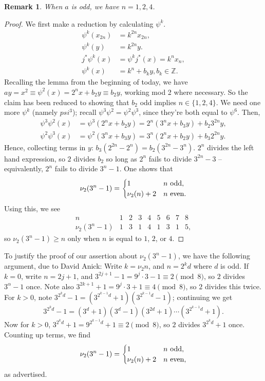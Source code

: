 \documentclass{article}
\newcommand{\Z}{\mathbb{Z}}
\newtheorem{rem}[thm]{Remark}
\begin{document}
\begin{rem}
When $a$ is odd, we have $n = 1, 2, 4$.
\end{rem}
\begin{proof}
We first make a reduction by calculating $\psi^k$.
\begin{align*}
\psi^k(x_{2n}) & = k^{2n} x_{2n}, \\
\psi^k(y) & = k^{2n} y. \\
j^* \psi^k(x) & = \psi^k j^*(x) = k^n x_n, \\
\psi^k(x) & = k^n + b_k y, b_k \in \Z.
\end{align*}
Recalling the lemma from the beginning of today, we have $ay = x^2 \equiv \psi^2(x) = 2^n x + b_2 y \equiv b_2 y$, working mod 2 where necessary.  So the claim has been reduced to showing that $b_2$ odd implies $n \in \{1, 2, 4\}$.  We need one more $\psi^k$ (namely $psi^3$); recall $\psi^3 \psi^2 = \psi^2 \psi^3$, since they're both equal to $\psi^6$.  Then,
\begin{align*}
\psi^3 \psi^2(x) & = \psi^3(2^n x + b_2 y) = 2^n(3^n x + b_3 y) + b_2 3^{2n} y, \\
\psi^2 \psi^3(x) & = \psi^2(3^n x + b_3 y) = 3^n(2^n x + b_2 y) + b_3 2^{2n} y.
\end{align*}
Hence, collecting terms in $y$: $b_3(2^{2n} - 2^n) = b_2(3^{2n} - 3^n)$.  $2^n$ divides the left hand expression, so $2$ divides $b_2$ so long as $2^n$ fails to divide $3^{2n} - 3$ -- equivalently, $2^n$ fails to divide $3^n - 1$.  One shows that
\[
\nu_2(3^n-1) = \begin{cases} 1 & \hbox{$n$ odd}, \\ \nu_2(n) + 2 & \hbox{$n$ even}.\end{cases}
\]
Using this, we see
\[
\begin{array}{c|cccccccc}
n & 1 & 2 & 3 & 4 & 5 & 6 & 7 & 8 \\
\hline \nu_2(3^n - 1) & 1 & 3 & 1 & 4 & 1 & 3 & 1 & 5,
\end{array}
\]
so $\nu_2(3^n-1) \ge n$ only when $n$ is equal to $1$, $2$, or $4$.
\end{proof}

To justify the proof of our assertion about $\nu_2(3^n - 1)$, we have the following argument, due to David Anick: Write $k = \nu_2 n$, and $n = 2^k d$ where $d$ is odd.  If $k = 0$, write $n = 2j + 1$, and $3^{2j+1} - 1 = 9^j \cdot 3 - 1 \equiv 2 \pmod 8$, so $2$ divides $3^\alpha - 1$ once.  Note also $3^{2k+1}+1 = 9^j \cdot 3 + 1 \equiv 4 \pmod 8$, so $2$ divides this twice.  For $k > 0$, note $3^{2^k d} - 1 = (3^{2^{k-1}d} + 1)(3^{2^{k-1}d} - 1)$; continuing we get
\[
3^{2^k d} - 1 = (3^d + 1) (3^d - 1) (3^{2d} + 1) \cdots (3^{2^{k-1}d} + 1).
\]
Now for $k > 0$, $3^{2^kd}+1 = 9^{2^{k-1}d}+1 \equiv 2 \pmod 8$, so $2$ divides $3^{2^k d} + 1$ once.  Counting up terms, we find
\[
\nu_2(3^n - 1) = \begin{cases} 1 & \hbox{$n$ odd}, \\ \nu_2(n) + 2 & \hbox{$n$ even}, \end{cases}
\]
as advertised.
\end{document}
